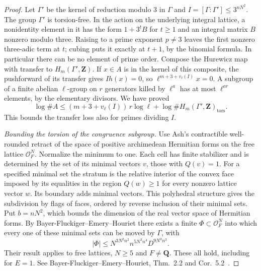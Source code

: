 \begin{proof}
Let \(\Gamma'\) be the kernel of reduction modulo \(3\) in \(\Gamma\)
and \(I=[\Gamma:\Gamma']\le3^{nN^2}\). The group \(\Gamma'\) is
torsion-free. In the action on the underlying integral lattice, a
nonidentity element in it has the form \(1+3^tB\) for \(t\ge1\) and
an integral matrix \(B\) nonzero modulo three. Raising to a prime
exponent \(p\ne3\) leaves the first nonzero
three-adic term at \(t\); cubing puts it exactly at \(t+1\), by the
binomial formula. In particular there can be no element of prime order.
Compose the Hurewicz map with transfer to
\(H_m(\Gamma',\mathbf Z)\). If \(x\in A\) is in the kernel of this
composite, the pushforward of its transfer gives \(Ih(x)=0\), so
\(\ell^{m+3+v_\ell(I)}x=0\). A subgroup of a finite abelian
\(\ell\)-group on \(r\) generators killed by \(\ell^a\) has at most
\(\ell^{ar}\) elements, by the elementary divisors. We have proved
\begin{equation}\label{newcoh:transfer}
 \log\#A\le
 (m+3+v_\ell(I))\,r\log\ell+
 \log\# H_m(\Gamma',\mathbf Z)_{\mathrm{tors}} .
\end{equation}
This bounds the transfer loss also for primes dividing \(I\).

\emph{Bounding the torsion of the congruence subgroup.}
Use Ash's contractible well-rounded retract of the space of positive
archimedean Hermitian forms on the free lattice \(\mathcal O_F^N\).
Normalize the minimum to one. Each cell has finite stabilizer and is
determined by the set of its minimal vectors \(v\), those with
\(Q(v)=1\). For a specified minimal set the stratum is the relative
interior of the convex face imposed by its equalities in the region
\(Q(w)\ge1\) for every nonzero lattice vector \(w\). Its boundary
adds minimal vectors. This polyhedral structure gives the subdivision
by flags of faces, ordered by reverse inclusion of their minimal
sets. Put
\(b=nN^2\), which bounds the dimension of the real vector space of
Hermitian forms. By Bayer-Fluckiger--Emery--Houriet there exists a
finite \(\Phi\subset\mathcal O_F^N\) into which every one of these
minimal sets can be moved by \(\Gamma\), with
\[
 |\Phi|\le N^{3N^2n^2} n^{5N^3n^4} D^{9N^3n^3}.
\]
Their result applies to free lattices, \(N\ge5\) and \(F\ne\mathbf Q\).
These all hold, including for \(E=1\).
See Bayer-Fluckiger--Emery--Houriet, Thm.~2.2 and Cor.~5.2~\cite{bayerEmeryHouriet}.


\end{proof}
